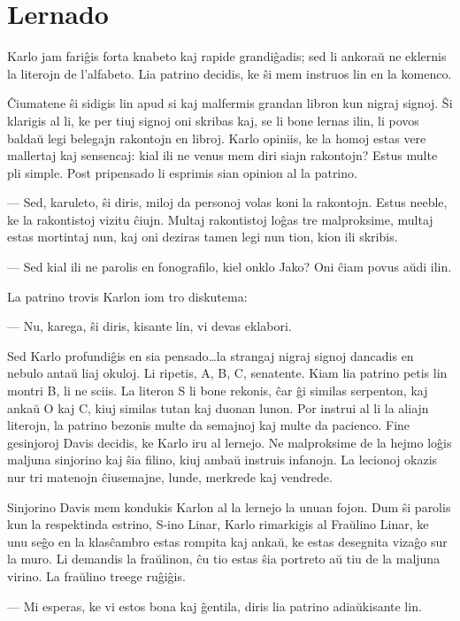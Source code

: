 \chapter{Lernado}

Karlo jam fariĝis forta knabeto kaj rapide grandiĝadis; sed li ankoraŭ ne eklernis la literojn de l'alfabeto. Lia patrino decidis, ke ŝi mem instruos lin en la komenco.

Ĉiumatene ŝi sidigis lin apud si kaj malfermis grandan libron kun nigraj signoj. Ŝi klarigis al li, ke per tiuj signoj oni skribas kaj, se li bone lernas ilin, li povos baldaŭ legi belegajn rakontojn en libroj. Karlo opiniis, ke la homoj estas vere mallertaj kaj sensencaj: kial ili ne venus mem diri siajn rakontojn? Estus multe pli simple. Post pripensado li esprimis sian opinion al la patrino.

— Sed, karuleto, ŝi diris, miloj da personoj volas koni la rakontojn. Estus neeble, ke la rakontistoj vizitu ĉiujn. Multaj rakontistoj loĝas tre malproksime, multaj estas mortintaj nun, kaj oni deziras tamen legi nun tion, kion ili skribis.

— Sed kial ili ne parolis en fonografilo, kiel onklo Jako? Oni ĉiam povus aŭdi ilin.

La patrino trovis Karlon iom tro diskutema:

— Nu, karega, ŝi diris, kisante lin, vi devas eklabori.

Sed Karlo profundiĝis en sia pensado\ldots{}la strangaj nigraj signoj dancadis en nebulo antaŭ liaj okuloj. Li ripetis, A, B, C, senatente. Kiam lia patrino petis lin montri B, li ne sciis. La literon S li bone rekonis, ĉar ĝi similas serpenton, kaj ankaŭ O kaj C, kiuj similas tutan kaj duonan lunon. Por instrui al li la aliajn literojn, la patrino bezonis multe da semajnoj kaj multe da pacienco. Fine gesinjoroj Davis decidis, ke Karlo iru al lernejo. Ne malproksime de la hejmo loĝis maljuna sinjorino kaj ŝia filino, kiuj ambaŭ instruis infanojn. La lecionoj okazis nur tri matenojn ĉiusemajne, lunde, merkrede kaj vendrede.

Sinjorino Davis mem kondukis Karlon al la lernejo la unuan fojon. Dum ŝi parolis kun la respektinda estrino, S-ino Linar, Karlo rimarkigis al Fraŭlino Linar, ke unu seĝo en la klasĉambro estas rompita kaj ankaŭ, ke estas desegnita vizaĝo sur la muro. Li demandis la fraŭlinon, ĉu tio estas ŝia portreto aŭ tiu de la maljuna virino. La fraŭlino treege ruĝiĝis.

— Mi esperas, ke vi estos bona kaj ĝentila, diris lia patrino adiaŭkisante lin.

